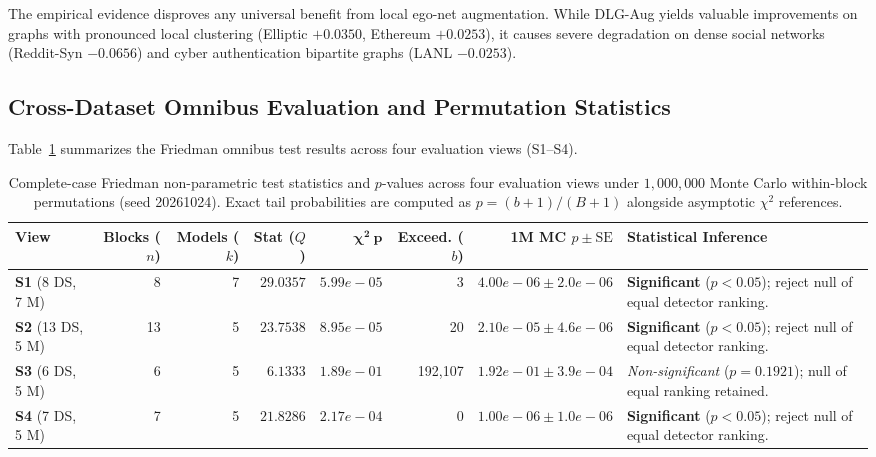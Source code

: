 \documentclass[11pt,a4paper]{article}
\begin{document}
The empirical evidence disproves any universal benefit from local ego-net augmentation. While DLG-Aug yields valuable improvements on graphs with pronounced local clustering (Elliptic $+0.0350$, Ethereum $+0.0253$), it causes severe degradation on dense social networks (Reddit-Syn $-0.0656$) and cyber authentication bipartite graphs (LANL $-0.0253$).

\subsection{Cross-Dataset Omnibus Evaluation and Permutation Statistics}
Table~\ref{tab:friedman_stats} summarizes the Friedman omnibus test results across four evaluation views (S1--S4).

\begin{table}[htbp]
\centering\footnotesize\setlength{\tabcolsep}{3.0pt}
\caption{Complete-case Friedman non-parametric test statistics and $p$-values across four evaluation views under $1{,}000{,}000$ Monte Carlo within-block permutations (seed 20261024). Exact tail probabilities are computed as $p = (b+1)/(B+1)$ alongside asymptotic $\chi^2$ references.}
\label{tab:friedman_stats}
\begin{tabularx}{\textwidth}{lrrrrrr>{\raggedright\arraybackslash}X}\toprule
\textbf{View} & \textbf{Blocks ($n$)} & \textbf{Models ($k$)} & \textbf{Stat ($Q$)} & $\mathbf{\chi^2\ p}$ & \textbf{Exceed. ($b$)} & \textbf{1M MC $p \pm \text{SE}$} & \textbf{Statistical Inference} \\\midrule
\textbf{S1} (8 DS, 7 M) & 8 & 7 & $29.0357$ & $5.99e-05$ & 3 & $4.00e-06 \pm 2.0e-06$ & \textbf{Significant} ($p < 0.05$); reject null of equal detector ranking. \\
\textbf{S2} (13 DS, 5 M) & 13 & 5 & $23.7538$ & $8.95e-05$ & 20 & $2.10e-05 \pm 4.6e-06$ & \textbf{Significant} ($p < 0.05$); reject null of equal detector ranking. \\
\textbf{S3} (6 DS, 5 M) & 6 & 5 & $6.1333$ & $1.89e-01$ & 192,107 & $1.92e-01 \pm 3.9e-04$ & \textit{Non-significant} ($p = 0.1921$); null of equal ranking retained. \\
\textbf{S4} (7 DS, 5 M) & 7 & 5 & $21.8286$ & $2.17e-04$ & 0 & $1.00e-06 \pm 1.0e-06$ & \textbf{Significant} ($p < 0.05$); reject null of equal detector ranking. \\
\bottomrule
\end{tabularx}
\end{table}
\end{document}
